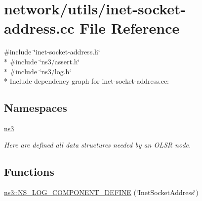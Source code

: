 \hypertarget{inet-socket-address_8cc}{}\section{network/utils/inet-\/socket-\/address.cc File Reference}
\label{inet-socket-address_8cc}
{\ttfamily \#include \char`\"{}inet-\/socket-\/address.\+h\char`\"{}}\\*
{\ttfamily \#include \char`\"{}ns3/assert.\+h\char`\"{}}\\*
{\ttfamily \#include \char`\"{}ns3/log.\+h\char`\"{}}\\*
Include dependency graph for inet-\/socket-\/address.cc\+:
\subsection*{Namespaces}
\begin{DoxyCompactItemize}
\item 
 \hyperlink{namespacens3}{ns3}
\begin{DoxyCompactList}\small\item\em Here are defined all data structures needed by an O\+L\+SR node. \end{DoxyCompactList}\end{DoxyCompactItemize}
\subsection*{Functions}
\begin{DoxyCompactItemize}
\item 
\hyperlink{namespacens3_aed668fed1e7621ae944e435f594f88e3}{ns3\+::\+N\+S\+\_\+\+L\+O\+G\+\_\+\+C\+O\+M\+P\+O\+N\+E\+N\+T\+\_\+\+D\+E\+F\+I\+NE} (\char`\"{}Inet\+Socket\+Address\char`\"{})
\end{DoxyCompactItemize}
